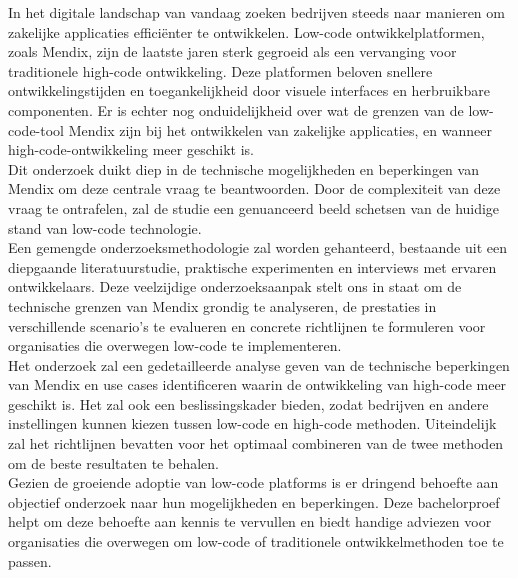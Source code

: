\documentclass[dutch,dit,thesis]{hogentreport}
\begin{document}
    In het digitale landschap van vandaag zoeken bedrijven steeds naar manieren om zakelijke applicaties efficiënter te ontwikkelen. Low-code ontwikkelplatformen, zoals Mendix, zijn de laatste jaren sterk gegroeid als een vervanging voor traditionele high-code ontwikkeling. Deze platformen beloven snellere ontwikkelingstijden en toegankelijkheid door visuele interfaces en herbruikbare componenten. Er is echter nog onduidelijkheid over wat de grenzen van de low-code-tool Mendix zijn bij het ontwikkelen van zakelijke applicaties, en wanneer high-code-ontwikkeling meer geschikt is.
    \\
    Dit onderzoek duikt diep in de technische mogelijkheden en beperkingen van Mendix om deze centrale vraag te beantwoorden. Door de complexiteit van deze vraag te ontrafelen, zal de studie een genuanceerd beeld schetsen van de huidige stand van low-code technologie.
    \\
    Een gemengde onderzoeksmethodologie zal worden gehanteerd, bestaande uit een diepgaande literatuurstudie, praktische experimenten en interviews met ervaren ontwikkelaars. Deze veelzijdige onderzoeksaanpak stelt ons in staat om de technische grenzen van Mendix grondig te analyseren, de prestaties in verschillende scenario's te evalueren en concrete richtlijnen te formuleren voor organisaties die overwegen low-code te implementeren.
    \\
    Het onderzoek zal een gedetailleerde analyse geven van de technische beperkingen van Mendix en use cases identificeren waarin de ontwikkeling van high-code meer geschikt is. Het zal ook een beslissingskader bieden, zodat bedrijven en andere instellingen kunnen kiezen tussen low-code en high-code methoden. Uiteindelijk zal het richtlijnen bevatten voor het optimaal combineren van de twee methoden om de beste resultaten te behalen.
    \\
    Gezien de groeiende adoptie van low-code platforms is er dringend behoefte aan objectief onderzoek naar hun mogelijkheden en beperkingen. Deze bachelorproef helpt om deze behoefte aan kennis te vervullen en biedt handige adviezen voor organisaties die overwegen om low-code of traditionele ontwikkelmethoden toe te passen.
    
    
    
    
    
    \backmatter{}
    
    \setlength\bibitemsep{2pt} %
    \printbibliography[heading=bibintoc]
    
\end{document}
